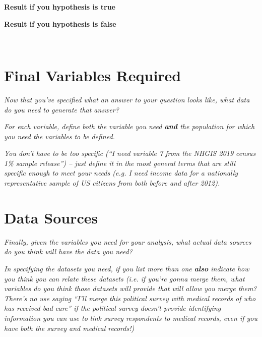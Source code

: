 \documentclass[12pt]{article}
\begin{document}
\begin{minipage}{0.5\textwidth}
\centering
\textbf{Result if you hypothesis is true}
\end{minipage}
\begin{minipage}{0.5\textwidth}
\centering
\textbf{Result if you hypothesis is false}
\end{minipage}
\vspace*{5cm}\\

\section{Final Variables Required}

\emph{Now that you've specified what an answer to your question looks like, what data do you need to generate that answer?}

\emph{For each variable, define both the variable you need \textbf{and} the population for which you need the variables to be defined.}

\emph{You don't have to be too specific (``I need variable 7 from the NHGIS 2019 census 1\% sample release'') -- just define it in the most general terms that are still specific enough to meet your needs (e.g. I need income data for a nationally representative sample of US citizens from both before and after 2012). }

\section{Data Sources}\label{section_datasources}

\emph{Finally, given the variables you need for your analysis, what actual data sources do you think will have the data you need?}

\emph{In specifying the datasets you need, if you list more than one \textbf{also} indicate how you think you can relate these datasets (i.e. if you're gonna merge them, what variables do you think those datasets will provide that will allow you merge them? There's no use saying ``I'll merge this political survey with medical records of who has received bad care'' if the political survey doesn't provide identifying information you can use to link survey respondents to medical records, even if you have both the survey and medical records!)}
\end{document}
